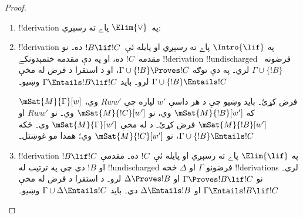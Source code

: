 \documentclass[../../../include/open-logic-section]{subfiles}
\begin{document}
\begin{proof}
\begin{enumerate}
  \item !!{derivation} په~$\Elim{\lor}$ پاے ته رسېږي:

  \item !!{derivation} په $\Intro{\lif}$ پاے ته رسېږي او
    پايله ئې~$!B\lif !C$ ده۔ نو مقدمه~$!C$ ده، او په دې مقدمه
    ختمېدونکے !!{derivation} !!{undischarged} فرضونه~$\Gamma \cup
    \{!B\}$ لري۔ په دې توګه $\Gamma \cup \{!B\} \Proves !C$،
    او د استقرا د فرض له مخې $\Gamma \cup \{!B\} \Entails !C$
    لرو۔ بايد $\Gamma \Entails !B \lif !C$ وښيو۔

    $\mSat{M}{\Gamma}[w]$ فرض کړئ۔ بايد وښيو چې د هر داسې
    $w'$ لپاره چې $Rww'$ وي، که $\mSat{M}{!B}[w']$ وي، نو
    $\mSat{M}{!C}[w']$ وي۔ نو $Rww'$ او
    $\mSat{M}{!B}[w']$ فرض کړئ۔ د
     له مخې
    $\mSat{M}{\Gamma}[w']$ وي۔ ځکه
    $\Gamma \cup \{!B\} \Entails !C$، نو
    $\mSat{M}{!C}[w']$ وي؛ همدا مو غوښتل۔

  \item !!{derivation} په $\Elim{\lif}$ پاے ته رسېږي او
    پايله ئې~$!C$ ده۔ مقدمې $!B \lif !C$ او $!B$ دي چې په
    ترتيب له !!{undischarged} فرضونو $\Gamma$ او $\Delta$
    څخه !!{derivation}s لري۔ نو $\Gamma \Proves !B \lif !C$ او
    $\Delta \Proves !B$ لرو۔ د استقرا د فرض له مخې
    $\Gamma \Entails !B \lif !C$ او $\Delta \Entails !B$
    دي۔ بايد $\Gamma \cup \Delta \Entails !C$ وښيو۔


\end{enumerate}
\end{proof}
\end{document}
